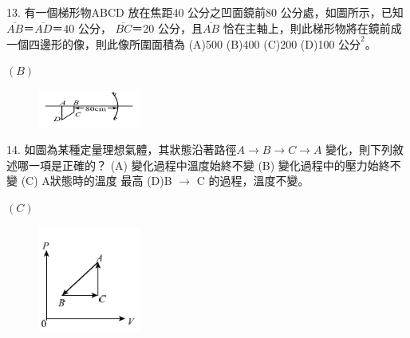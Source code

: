 \documentclass[cn,10pt,math=newtx]{elegantbook}
\begin{document}
\newpage


\begin{example}
   13. 有一個梯形物ABCD 放在焦距40 公分之凹面鏡前80 公分處，如圖所示，已知$\overline{AB} ＝
\overline{AD} ＝40$ 公分， $\overline{BC} ＝$20 公分，且$\overline{AB}$ 恰在主軸上，則此梯形物將在鏡前成一個四邊形的像，則此像所圍面積為
(A)500 (B)400 (C)200 (D)100 $公分^2$。\\
    \rightline{[全國聯招教甄109]}
\end{example}
\begin{solution}
    $(B)$
\end{solution}
\begin{figure}[htbp]
    \flushright
    \includegraphics[width=0.3\textwidth]{image/109全國13.png}
  \end{figure}
\newpage



\begin{example}
   14. 如圖為某種定量理想氣體，其狀態沿著路徑$A\rightarrow B\rightarrow C\rightarrow A$ 變化，則下列敘述哪一項是正確的？ (A) 變化過程中溫度始終不變 (B) 變化過程中的壓力始終不變 (C) A狀態時的溫度
最高 (D)B $\rightarrow$ C 的過程，溫度不變。\\
    \rightline{[全國聯招教甄109]}
\end{example}
\begin{solution}
    $(C)$
\end{solution}
\begin{figure}[htbp]
    \flushright
    \includegraphics[width=0.3\textwidth]{image/109全國14.png}
  \end{figure}
\newpage
\end{document}
